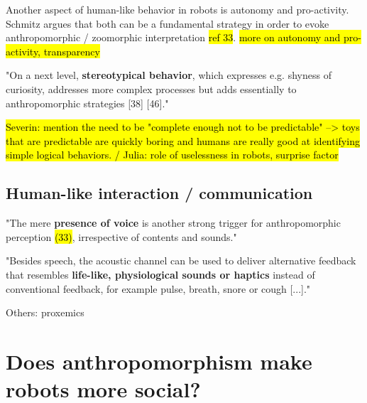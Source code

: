 \documentclass[twocolumn]{svjour3}          %
\begin{document}
	Another aspect of human-like behavior in robots is autonomy and pro-activity. Schmitz argues that both can be a fundamental strategy in order to evoke anthropomorphic / zoomorphic interpretation \cite{schmitz_concepts_2011} \hl{ref 33}. \hl{more on autonomy and pro-activity, transparency}

	"On a next level, \textbf{stereotypical behavior}, which expresses e.g. shyness of curiosity, addresses more complex processes but adds essentially to anthropomorphic strategies [38] [46]." \cite{schmitz_concepts_2011}
	
	\hl{Severin: mention the need to be "complete enough not to be predictable" --> toys that are predictable are quickly boring and humans are really good at identifying simple logical behaviors. / Julia: role of uselessness in robots, surprise factor}


\subsection{Human-like interaction / communication}
\label{sec:4.3}


	"The mere \textbf{presence of voice} is another strong trigger for anthropomorphic perception \hl{(33)}, irrespective of contents and sounds." \cite{schmitz_concepts_2011}

	"Besides speech, the acoustic channel can be used to deliver alternative feedback that resembles \textbf{life-like, physiological sounds or haptics} instead of conventional feedback, for example pulse, breath, snore or cough [...]." \cite{schmitz_concepts_2011}


Others: proxemics


%
%
%
%
%
%


\section{Does anthropomorphism make robots more social?}
\label{sec:5}
\end{document}
